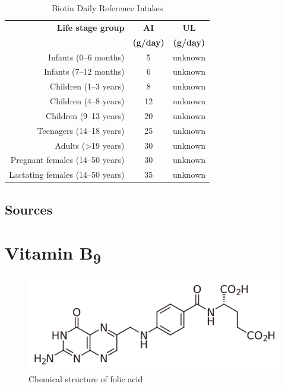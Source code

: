 \documentclass{book}
\begin{document}
\begin{sloppypar}
\begin{table}[ht]
	\caption{Biotin Daily Reference Intakes}
	\centering \begin{tabular}{| r | c | c |}
		\hline
		\textbf{Life stage group}			& \textbf{AI}				& \textbf{UL}				\\
											& \textbf{(\textmu g/day)}	& \textbf{(\textmu g/day)}	\\ \hline
		Infants (0--6 months)				& 5							& unknown					\\ \hline
		Infants (7--12 months)				& 6							& unknown					\\ \hline
		Children (1--3 years)				& 8							& unknown					\\ \hline
		Children (4--8 years)				& 12						& unknown					\\ \hline
		Children (9--13 years)				& 20						& unknown					\\ \hline
		Teenagers (14--18 years)			& 25						& unknown					\\ \hline
		Adults (\textgreater19 years)		& 30						& unknown					\\ \hline
		Pregnant females (14--50 years)		& 30						& unknown					\\ \hline
		Lactating females (14--50 years)	& 35						& unknown					\\ \hline
	\end{tabular}
\end{table}
\newpage

\section{Sources}


\chapter{Vitamin B\texorpdfstring{\textsubscript{9}}{9}}
\begin{figure}[h]
	\caption{Chemical structure of folic acid}
	\centering \includegraphics[width=\textwidth]{images/Vitamin_B9_chemical_structure}
\end{figure}
\newpage


\end{sloppypar}
\end{document}
